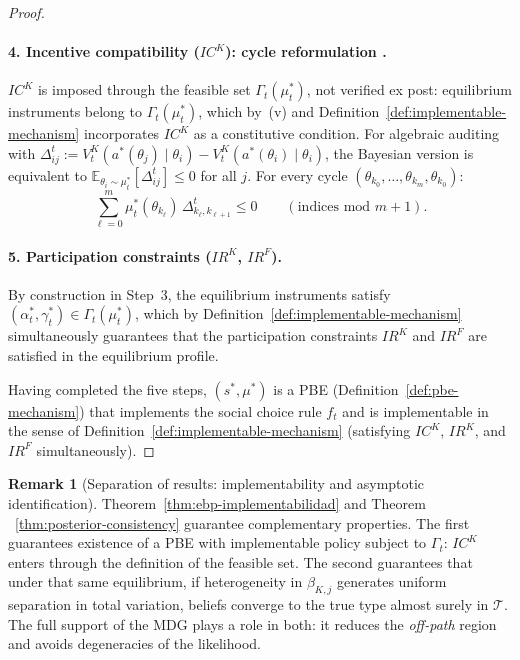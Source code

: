 \documentclass[12pt]{article}
\numberwithin{equation}{section}
\numberwithin{table}{section}
\theoremstyle{definition}
\newtheorem{remark}[theorem]{Remark}
\begin{document}
\begin{proof}
\paragraph{4. Incentive compatibility ($IC^K$): cycle reformulation
\citep{Rochet1987}.}
$IC^K$ is imposed through the feasible set $\Gamma_t(\mu_t^\ast)$, not verified
ex post: equilibrium instruments belong to $\Gamma_t(\mu_t^\ast)$, which by~(v)
and Definition~\ref{def:implementable-mechanism} incorporates $IC^K$ as a
constitutive condition. For algebraic auditing with
$\Delta_{ij}^t:=V^K_t(a^\ast(\theta_j)\mid\theta_i)
-V^K_t(a^\ast(\theta_i)\mid\theta_i)$, the Bayesian version is equivalent to
$\mathbb{E}_{\theta_i\sim\mu_t^\ast}[\Delta_{ij}^t]\le 0$ for all $j$.
For every cycle $(\theta_{k_0},\ldots,\theta_{k_m},\theta_{k_0})$:
\[
\sum_{\ell=0}^{m}
\mu_t^\ast(\theta_{k_\ell})\,\Delta_{k_\ell,k_{\ell+1}}^t\le 0
\qquad(\text{indices mod }m+1).
\]

\paragraph{5. Participation constraints ($IR^K$, $IR^F$).}
By construction in Step~3, the equilibrium instruments satisfy $(\alpha_t^\ast,\gamma_t^\ast)\in\Gamma_t(\mu_t^\ast)$,
which by Definition~\ref{def:implementable-mechanism} simultaneously guarantees that the participation constraints $IR^K$ and $IR^F$ are satisfied in the
equilibrium profile.

Having completed the five steps, $(s^\ast,\mu^\ast)$ is a PBE (Definition~\ref{def:pbe-mechanism}) that implements
the social choice rule $f_t$ and is implementable in the sense of Definition~\ref{def:implementable-mechanism} (satisfying $IC^K$, $IR^K$, and $IR^F$ simultaneously).
\end{proof}

\begin{remark}[Separation of results: implementability and asymptotic identification]
Theorem~\ref{thm:ebp-implementabilidad} and Theorem
~\ref{thm:posterior-consistency} guarantee complementary properties. The first
guarantees existence of a PBE with implementable policy subject to
$\Gamma_t$: $IC^K$ enters through the definition of the feasible set. The
second guarantees that under that same equilibrium, if heterogeneity in
$\beta_{K,j}$ generates uniform separation in total variation, beliefs converge
to the true type almost surely in $\mathcal{T}$. The full support of the MDG
plays a role in both: it reduces the \emph{off-path} region and avoids
degeneracies of the likelihood.
\end{remark}
\end{document}
